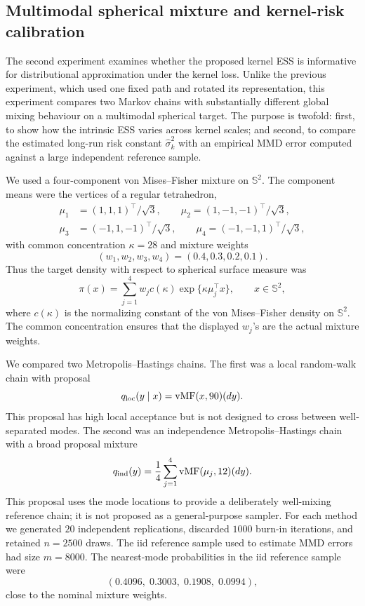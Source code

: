 \documentclass[11pt]{article}
\newcommand{\bbS}{\mathbb{S}}
\newcommand{\1}{\mathbf{1}}
\begin{document}
\subsection{Multimodal spherical mixture and kernel-risk calibration}
\label{subsec:spherical-mixture-experiment}

The second experiment examines whether the proposed kernel ESS is informative for distributional approximation under the kernel loss.  Unlike the previous experiment, which used one fixed path and rotated its representation, this experiment compares two Markov chains with substantially different global mixing behaviour on a multimodal spherical target.  The purpose is twofold: first, to show how the intrinsic ESS varies across kernel scales; and second, to compare the estimated long-run risk constant \(\widehat\sigma_k^2\) with an empirical MMD error computed against a large independent reference sample.

We used a four-component von Mises--Fisher mixture on \(\bbS^2\).  The component means were the vertices of a regular tetrahedron,
\[
\begin{split}
\mu_1&=(1,1,1)^\top/\sqrt 3,\qquad
\mu_2=(1,-1,-1)^\top/\sqrt 3,\\
\mu_3&=(-1,1,-1)^\top/\sqrt 3,\qquad
\mu_4=(-1,-1,1)^\top/\sqrt 3,
\end{split}
\]
with common concentration \(\kappa=28\) and mixture weights
\[
    (w_1,w_2,w_3,w_4)=(0.4,0.3,0.2,0.1).
\]
Thus the target density with respect to spherical surface measure was
\[
    \pi(x)
    =
    \sum_{j=1}^4 w_j c(\kappa)\exp\{\kappa \mu_j^\top x\},
    \qquad x\in \bbS^2,
\]
where \(c(\kappa)\) is the normalizing constant of the von Mises--Fisher density on \(\bbS^2\).  The common concentration ensures that the displayed \(w_j\)'s are the actual mixture weights.

We compared two Metropolis--Hastings chains.  The first was a local random-walk chain with proposal
\[
    q_{\rm loc}(y\mid x)={\rm vMF}(x,90)(dy).
\]
This proposal has high local acceptance but is not designed to cross between well-separated modes.  The second was an independence Metropolis--Hastings chain with a broad proposal mixture
\[
    q_{\rm ind}(y)
    =
    \frac14\sum_{j=1}^4 {\rm vMF}(\mu_j,12)(dy).
\]
This proposal uses the mode locations to provide a deliberately well-mixing reference chain; it is not proposed as a general-purpose sampler.  For each method we generated \(20\) independent replications, discarded \(1000\) burn-in iterations, and retained \(n=2500\) draws.  The iid reference sample used to estimate MMD errors had size \(m=8000\).  The nearest-mode probabilities in the iid reference sample were
\[
    (0.4096,\;0.3003,\;0.1908,\;0.0994),
\]
close to the nominal mixture weights.
\end{document}
